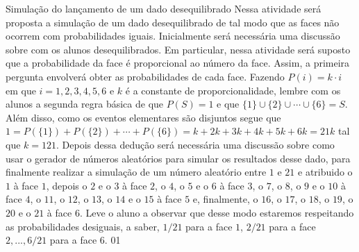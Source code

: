 \begin{sugestions}{Simulação do lançamento de um dado desequilibrado}
{
Nessa atividade será proposta a simulação de um dado desequilibrado de tal modo que as faces não ocorrem com probabilidades iguais. Inicialmente será necessária uma discussão sobre com os alunos desequilibrados. Em particular, nessa atividade será suposto que a probabilidade da face é proporcional ao número da face. Assim, a primeira pergunta envolverá obter as probabilidades de cada face. Fazendo $P({i})=k\cdot i$ em que $i=1,2,3,4,5,6$ e $k$ é a constante de proporcionalidade, lembre com os alunos a segunda regra básica de que $P(S)=1$ e que $\{1\}\cup\{2\}\cup\cdots\cup\{6\}=S$. Além disso, como os eventos elementares são disjuntos segue que $1=P(\{1\})+P(\{2\})+\cdots+P(\{6\})=k+2k+3k+4k+5k+6k=21k$ tal que $k=121$. Depois dessa dedução será necessária uma discussão sobre como usar o gerador de números aleatórios para simular os resultados desse dado, para finalmente realizar a simulação de um número aleatório entre $1$ e $21$ e atribuido o $1$ à face $1$, depois o $2$ e o $3$ à face $2$, o $4$, o $5$ e o $6$ à face $3$, o $7$, o $8$, o $9$ e o $10$ à face $4$, o $11$, o $12$, o $13$, o $14$ e o $15$ à face $5$ e, finalmente, o $16$, o $17$, o $18$, o $19$, o $20$ e o $21$ à face $6$. Leve o aluno a observar que desse modo estaremos respeitando as probabilidades desiguais, a saber, $1/21$ para a face $1$, $2/21$ para a face $2,..., 6/21$ para a face $6$.
}{0}{1}
\end{sugestions}
